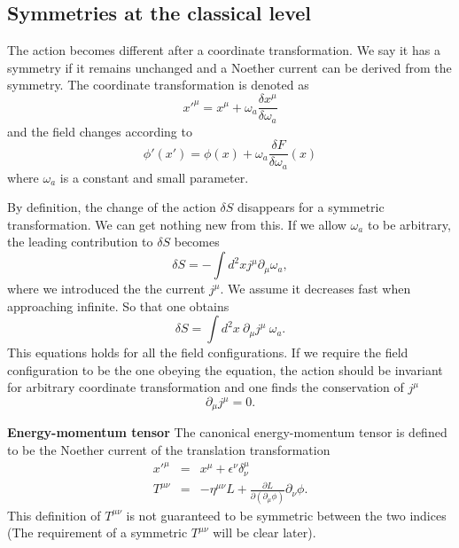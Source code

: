 \documentclass[submission, PhysLectNotes]{SciPost}
\begin{document}
\subsection{Symmetries at the classical level}
The action becomes different after a coordinate transformation. We say it has a symmetry if it remains unchanged and a Noether current can be derived from the symmetry. The coordinate transformation is denoted as
\begin{equation}
    x'^\mu = x^\mu + \omega_a \frac{\delta x^\mu}{\delta \omega_a}
\end{equation}
and the field changes according to
\begin{equation}
    \phi'(x') = \phi(x) + \omega_a \frac{\delta F}{\delta \omega_a}(x)
\end{equation}
where $\omega_a$ is a constant and small parameter.

By definition, the change of the action $\delta S$ disappears for a symmetric transformation. We can get nothing new from this. If we allow $\omega_a$ to be arbitrary, the leading contribution to $\delta S$ becomes
\begin{equation}
    \delta S = -\int d^2x j^\mu \partial_\mu \omega_a,
\end{equation}
where we introduced the the current $j^\mu$. We assume it decreases fast when approaching infinite. So that one obtains
\begin{equation}
    \delta S = \int d^2x\ \partial_\mu j^\mu \ \omega_a.
\end{equation}
This equations holds for all the field configurations. If we require the field configuration to be the one obeying the equation, the action should be invariant for arbitrary coordinate transformation and one finds the conservation of $j^\mu$
\begin{equation}
    \partial_\mu j^\mu = 0.
\end{equation}

{\bf Energy-momentum tensor}
The canonical energy-momentum tensor is defined to be the Noether current of the translation transformation
\begin{eqnarray}
    x'^\mu &=& x^\mu + \epsilon^\nu \delta^\mu_\nu \\
    T^{\mu\nu} &=& -\eta^{\mu\nu} L + \frac{\partial L}{\partial(\partial_\mu \phi)}\partial_\nu \phi.
\end{eqnarray}
This definition of $T^{\mu\nu}$ is not guaranteed to be symmetric between the two indices (The requirement of a symmetric $T^{\mu\nu}$ will be clear later).
\end{document}

